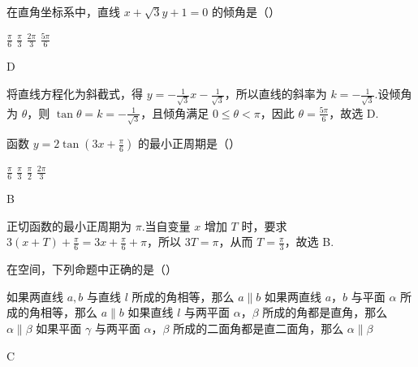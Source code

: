 \documentclass[UTF8,a4paper,oneside,11pt]{ctexbook}
\begin{document}
\begin{problem}

在直角坐标系中，直线 \(x+\sqrt{3}y+1=0\) 的倾角是（\quad）

\choices
    {\(\frac{\pi}{6}\)}
    {\(\frac{\pi}{3}\)}
    {\(\frac{2\pi}{3}\)}
    {\(\frac{5\pi}{6}\)}
\end{problem}

\begin{answer}
D
\end{answer}

\begin{solution}
将直线方程化为斜截式，得
\(y=-\frac{1}{\sqrt{3}}x-\frac{1}{\sqrt{3}}\)，所以直线的斜率为
\(k=-\frac{1}{\sqrt{3}}\).设倾角为 \(\theta\)，则
\(\tan\theta=k=-\frac{1}{\sqrt{3}}\)，且倾角满足 \(0\leqslant\theta<\pi\)，因此
\(\theta=\frac{5\pi}{6}\)，故选 D.
\end{solution}

\begin{problem}

函数 \(y=2\tan\left( 3x+\frac{\pi}{6} \right)\) 的最小正周期是（\quad）

\choices
    {\(\frac{\pi}{6}\)}
    {\(\frac{\pi}{3}\)}
    {\(\frac{\pi}{2}\)}
    {\(\frac{2\pi}{3}\)}
\end{problem}

\begin{answer}
B
\end{answer}

\begin{solution}
正切函数的最小正周期为 \(\pi\).当自变量 \(x\) 增加 \(T\) 时，要求
\(3(x+T)+\frac{\pi}{6}=3x+\frac{\pi}{6}+\pi\)，所以 \(3T=\pi\)，从而
\(T=\frac{\pi}{3}\)，故选 B.
\end{solution}

\begin{problem}

在空间，下列命题中正确的是（\quad）

\choices
    {如果两直线 \(a,b\) 与直线 \(l\) 所成的角相等，那么 \(a\parallel b\)}
    {如果两直线 \(a\)，\(b\) 与平面 \(\alpha\) 所成的角相等，那么 \(a\parallel b\)}
    {如果直线 \(l\) 与两平面 \(\alpha\)，\(\beta\) 所成的角都是直角，那么 \(\alpha\parallel\beta\)}
    {如果平面 \(\gamma\) 与两平面 \(\alpha\)，\(\beta\) 所成的二面角都是直二面角，那么 \(\alpha\parallel\beta\)}
\end{problem}

\begin{answer}
C
\end{answer}
\end{document}
